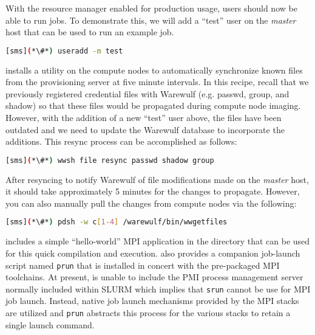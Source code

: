 With the resource manager enabled for production usage, users should now be
able to run jobs.  To demonstrate this, we will add a ``test'' user on the {\em master}
host that can be used to run an example job.

\begin{lstlisting}[language=bash,keywords={}]
[sms](*\#*) useradd -m test
\end{lstlisting}

\Warewulf{} installs a utility on the compute nodes to automatically 
synchronize known files from the provisioning server at five minute intervals. In this
recipe, recall that we previously registered credential files with Warewulf (e.g. passwd,
group, and shadow) so that these files would be propagated during compute node
imaging. However, with the addition of a new ``test'' user above, the files
have been outdated and we need to update the Warewulf database to incorporate
the additions. This resync process can be accomplished as follows:

\begin{lstlisting}[language=bash,keywords={}]
[sms](*\#*) wwsh file resync passwd shadow group
\end{lstlisting}

\begin{center}
\begin{tcolorbox}[]
\small
After resyncing to notify Warewulf of file modifications made on the {\em
master} host, it should take approximately 5 minutes for the changes to
propagate. However, you can also manually pull the changes from compute nodes
via the following:
\begin{lstlisting}[language=bash,keywords={}]
[sms](*\#*) pdsh -w c[1-4] /warewulf/bin/wwgetfiles 
\end{lstlisting}
\end{tcolorbox}
\end{center}


\OHPC{} includes a simple ``hello-world'' MPI application in the
 directory that can be used for this quick
compilation and execution. \OHPC{} also provides a companion job-launch script
named \texttt{prun} that is installed in concert with the pre-packaged MPI
toolchains. At present, \OHPC{} is unable to include the PMI process management
server normally included within SLURM which implies that \texttt{srun} cannot
be use for MPI job launch. Instead, native job launch mechanisms provided by
the MPI stacks are utilized and \texttt{prun} abstracts this process for the
various stacks to retain a single launch command.

